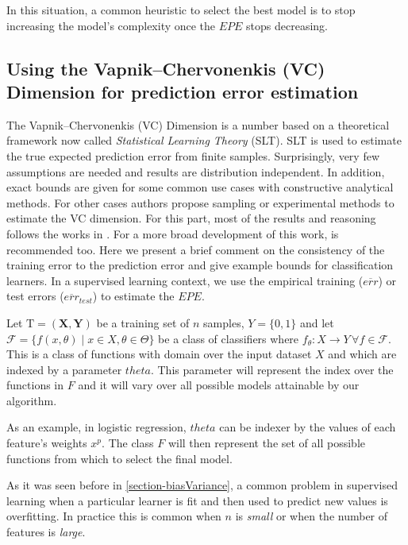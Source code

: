 In this situation, a common heuristic to select the best model is to stop increasing the model's complexity once the $EPE$ stops decreasing.

\subsection{ Using the Vapnik--Chervonenkis (VC) Dimension for prediction error estimation} \label{section-VcDimension}


The Vapnik--Chervonenkis (VC) Dimension is a number based on a theoretical framework now called \textit{Statistical Learning Theory} (SLT). SLT is used to estimate the true expected prediction error from finite samples. Surprisingly, very few assumptions are needed and results are distribution independent. In addition, exact bounds are given for some common use cases with constructive analytical methods. For other cases authors propose sampling or experimental methods to estimate the VC dimension. For this part, most of the results and reasoning follows the works in \textcite{cherkassky-learning2007}. For a more broad development of this work, \textcite{vapnik-nature2013} is recommended too. Here we present a brief comment on the consistency of the training error to the prediction error and give example bounds for classification learners. In a supervised learning context, we use the empirical training ($\overline{err}$) or test errors ($\overline{err}_{test}$) to estimate the $EPE$.

Let $\mathrm{T} = (\textbf{X},\textbf{Y})$ be a training set of $n$ samples, $Y = \{0,1 \}$ and let $\mathcal {F} = \{f(x,\theta) \mid x \in X, \theta \in \Theta\}$ be a class of classifiers where $f_\theta: X \rightarrow Y \, \forall f \in \mathcal {F}$. This is a class of functions with domain over the input dataset $X$ and which are indexed by a parameter $theta$. This parameter will represent the index over the functions in $F$ and it will vary over all possible models attainable by our algorithm.

As an example, in logistic regression, $theta$ can be indexer by the values of each feature's weights $x^p$. The class $F$ will then represent the set of all possible functions from which to select the final model.

As it was seen before in \ref{section-biasVariance}, a common problem in supervised learning when a particular learner is fit and then used to predict new values is overfitting. In practice this is common when $n$ is \textit{small} or when the number of features is \textit{large}.

